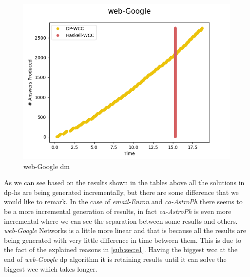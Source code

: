 \documentclass[preprint]{elsarticle}
\begin{document}
\begin{figure}[!htb]
\begin{minipage}{0.33\textwidth}
     \includegraphics[width=1\linewidth, height=0.2\textheight]{web_google}
      \caption{web-Google \acrshort{dm}}
      \label{fig:dief:3}
    \end{minipage}
\end{figure}

As we can see based on the results shown in the tables above all the solutions in \acrshort{dp}-\acrshort{hs} are being generated incrementally, but there are some difference that we would like to remark. In the case of \emph{email-Enron} and \emph{ca-AstroPh} there seems to be a more incremental generation of results, in fact \emph{ca-AstroPh} is even more incremental where we can see the separation between some results and others. \emph{web-Google} Networks is a little more linear and that is because all the results are being generated with very little difference in time between them. This is due to the fact of the explained reasons in \autoref{sub:sec:e1}. Having the biggest \acrshort{wcc} at the end of \emph{web-Google} \acrshort{dp} algorithm it is retaining results until it can solve the biggest \acrshort{wcc} which takes longer. 
\end{document}
